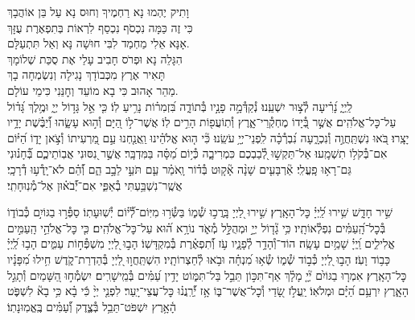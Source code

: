 \documentclass[twoside, openany, parskip=half, 11pt]{book}
\begin{document}
וָתִיק יֶהְמוּ נָא רַחְמֶיךָ וְחוּס נָא עַל בֵּן אוֹהֲבָךְ\\
כִּי זֶה כַּמָּה נִכְסֹף נִכְסַף לִרְאוֹת בְּתִפְאֶרֶת עֻזָּךְ\\
אָנָּא אֵלִי מַחְמַד לִבִּי חוּשָׁה נָּא וְאַל תִּתְעַלָּם.\\

הִגָּלֵה נָא וּפְרֹס חָבִיב עָלַי אֶת סֻכַּת שְׁלוֹמָךְ\\
תָּאִיר אֶרֶץ מִכְּבוֹדָךְ נָגִילָה וְנִשְׂמְחָה בָךְ\\
מַהֵר אָהוּב כִּי בָא מוֹעֵד וְחׇנֵּנִי כִּימֵי עוֹלָם.\\

לַֽיְיָ֑ נָ֝רִ֗יעָה לְ֯צ֣וּר יִשְׁעֵֽנוּ׃
נְ֯קַדְּ֯מָ֣ה פָנָ֣יו בְּ֯תוֹדָ֑ה בִּ֝זְמִר֗וֹת נָרִ֥יעַ לֽוֹ׃
כִּ֤י אֵ֣ל גָּד֣וֹל יְיָ֑ וּמֶ֥לֶךְ גָּ֝ד֗וֹל עַל־כׇּל־אֱלֹהִֽים׃
אֲשֶׁ֣ר בְּ֭֯יָדוֹ מֶחְקְ֯רֵי־אָ֑רֶץ וְ֯תֽוֹעֲפ֖וֹת הָרִ֣ים לֽוֹ׃
אֲשֶׁר־ל֣וֹ הַ֭יָּם וְ֯ה֣וּא עָשָׂ֑הוּ וְ֝֯יַבֶּ֗שֶׁת יָדָ֥יו יָצָֽרוּ׃
בֹּ֭אוּ נִשְׁתַּֽחֲוֶ֣ה וְ֯נִכְרָ֑עָה נִ֝בְרְ֯כָ֗ה לִֽפְנֵי־יְיָ֥ עֹשֵֽׂנוּ׃
כִּ֘י ה֤וּא אֱלֹהֵ֗ינוּ וַֽאֲנַ֤חְנוּ עַ֣ם מַ֭רְעִיתוֹ וְ֯צֹ֣אן יָד֑וֹ הַ֝יּ֗וֹם אִם־בְּ֯קֹל֥וֹ תִשְׁמָֽעוּ׃
אַל־תַּקְשׁ֣וּ לְ֭֯בַבְכֶם כִּמְרִיבָ֑ה כְּ֯י֥וֹם מַ֝סָּ֗ה בַּמִּדְבָּֽר׃
אֲשֶׁ֣ר נִ֭סּוּנִי אֲבֽוֹתֵיכֶ֑ם בְּ֝֯חָנ֗וּנִי גַּם־רָא֥וּ פָֽעֳלִֽי׃
אַ֘רְבָּעִ֤ים שָׁנָ֨ה אָ֘ק֤וּט בְּ֯ד֗וֹר וָֽאֹמַ֗ר עַ֤ם תֹּעֵ֣י לֵבָ֣ב הֵ֑ם וְ֝֯הֵ֗ם לֹא־יָֽדְ֯ע֥וּ דְ֯רָכָֽי׃
אֲשֶֽׁר־נִשְׁבַּ֥עְתִּי בְ֯אַפִּ֑י אִם־יְ֝֯בֹא֗וּן אֶל־מְ֯נֽוּחָתִֽי׃


שִׁ֣יר חָדָ֑שׁ שִׁ֥ירוּ לַֽ֝יְיָ֗ כׇּל־הָאָֽרֶץ׃
שִׁ֣ירוּ לַ֭יְיָ בָּֽרֲכ֣וּ שְׁ֯מ֑וֹ בַּשְּׂ֯ר֥וּ מִיּֽוֹם־לְ֝֯י֗וֹם יְ֯שֽׁוּעָתֽוֹ׃
סַפְּ֯ר֣וּ בַגּוֹיִ֣ם כְּ֯בוֹד֑וֹ בְּ֯כׇל־הָֽ֝עַמִּ֗ים נִפְלְ֯אוֹתָֽיו׃
כִּ֥י גָ֘ד֤וֹל יְיָ֣ וּמְהֻלָּ֣ל מְ֯אֹ֑ד נוֹרָ֥א ה֝֗וּא עַל־כׇּל־אֱלֹהִֽים׃
כִּ֤י כׇּל־אֱלֹהֵ֣י הָֽעַמִּ֣ים אֱלִילִ֑ים וַֽ֝יְיָ֗ שָׁמַ֥יִם עָשָֽׂה׃
הוֹד־וְ֯הָדָ֥ר לְ֯פָנָ֑יו עֹ֥ז וְ֝֯תִפְאֶ֗רֶת בְּ֯מִקְדָּשֽׁוֹ׃
הָב֣וּ לַ֭יְיָ מִשְׁפְּ֯ח֣וֹת עַמִּ֑ים הָב֥וּ לַֽ֝יְיָ֗ כָּב֥וֹד וָעֹֽז׃
הָב֣וּ לַ֭יְיָ כְּ֯ב֣וֹד שְׁ֯מ֑וֹ שְׂ֯א֥וּ מִ֝נְחָ֗ה וּבֹ֥אוּ לְ֯חַצְרוֹתָֽיו׃
הִשְׁתַּֽחֲו֣וּ לַ֭יְיָ בְּ֯הַדְרַת־קֹ֑דֶשׁ חִ֥ילוּ מִ֝פָּנָ֗יו כׇּל־הָאָֽרֶץ׃
אִמְר֤וּ בַגּוֹיִ֨ם יְ֘יָ֤ מָלָ֗ךְ אַף־תִּכּ֣וֹן תֵּבֵ֣ל בַּל־תִּמּ֑וֹט יָדִ֥ין עַ֝מִּ֗ים בְּ֯מֵֽישָׁרִֽים׃
יִשְׂמְ֯ח֣וּ הַ֭שָּׁמַיִם וְ֯תָגֵ֣ל הָאָ֑רֶץ יִרְעַ֥ם הַ֝יָּ֗ם וּמְלֹאֽוֹ׃
יַֽעֲלֹ֣ז שָׂ֭דַי וְ֯כׇל־אֲשֶׁר־בּ֑וֹ אָ֥ז יְ֝֯רַֽנֲנ֗וּ כׇּל־עֲצֵי־יָֽעַר׃
לִפְנֵ֤י יְיָ֨ כִּ֬י בָ֗א כִּ֥י בָא֘ לִשְׁפֹּ֢ט הָ֫אָ֥רֶץ יִשְׁפֹּט־תֵּבֵ֥ל בְּ֯צֶ֑דֶק וְ֝֯עַמִּ֗ים בֶּֽאֱמֽוּנָתֽוֹ׃
\end{document}
